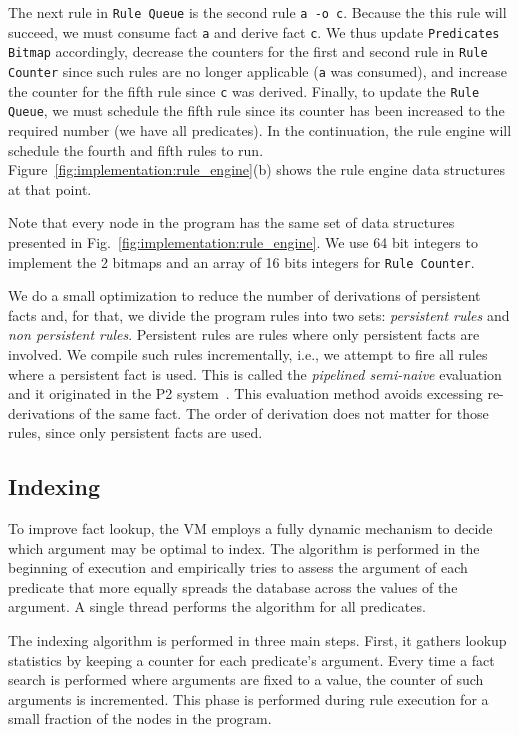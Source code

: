 The next rule in \texttt{Rule Queue} is the second rule \texttt{a -o c}.
Because the this rule will succeed, we must consume fact \texttt{a} and derive
fact \texttt{c}. We thus update \texttt{Predicates Bitmap} accordingly, decrease
the counters for the first and second rule in \texttt{Rule Counter} since such
rules are no longer applicable (\texttt{a} was consumed), and increase the
counter for the fifth rule since \texttt{c} was derived. Finally, to update the
\texttt{Rule Queue}, we must schedule the fifth rule since its counter has been
increased to the required number (we have all predicates).  In the continuation,
the rule engine will schedule the fourth and fifth rules to run.
Figure~\ref{fig:implementation:rule_engine}(b) shows the rule engine data
structures at that point.

Note that every node in the program has the same set of data structures
presented in Fig.~\ref{fig:implementation:rule_engine}. We use 64 bit integers
to implement the 2 bitmaps and an array of 16 bits integers for \texttt{Rule
Counter}.

We do a small optimization to reduce the number of derivations of persistent
facts and, for that, we divide the program rules into two sets: \emph{persistent
rules} and \emph{non persistent rules}. Persistent rules are rules where only
persistent facts are involved. We compile such rules incrementally, i.e., we
attempt to fire all rules where a persistent fact is used. This is called the
\emph{pipelined semi-naive} evaluation and it originated in the P2
system~\cite{Loo-condie-garofalakis-p2}. This evaluation method avoids excessing
re-derivations of the same fact. The order of derivation does not matter for
those rules, since only persistent facts are used.

\subsection{Indexing}\label{sec:implementation:indexing}

To improve fact lookup, the VM employs a fully dynamic mechanism to
decide which argument may be optimal to index.  The algorithm is
performed in the beginning of execution and empirically tries to
assess the argument of each predicate that more equally spreads the
database across the values of the argument.  A single thread performs
the algorithm for all predicates.

The indexing algorithm is performed in three main steps. First, it
gathers lookup statistics by keeping a counter for each
predicate's argument.  Every time a fact search is performed where
arguments are fixed to a value, the counter of such arguments is
incremented. This phase is performed during rule execution for a small
fraction of the nodes in the program.


